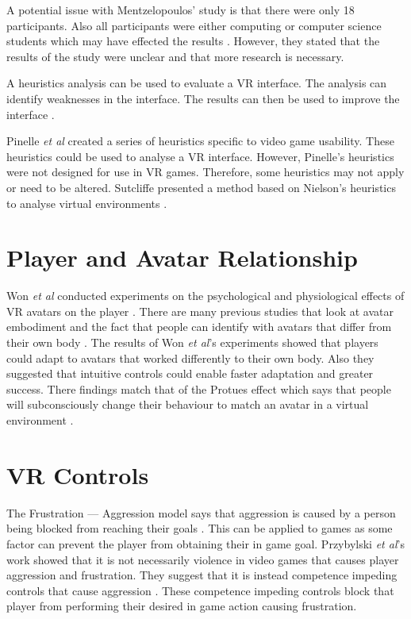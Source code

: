 \documentclass{scrartcl}
\begin{document}
A potential issue with Mentzelopoulos' study is that there were only 18 participants. Also all participants were either computing or computer science students which may have effected the results \cite{Mentzelopoulos}. However, they stated that the results of the study were unclear and that more research is necessary.

\bigskip 
 
A heuristics analysis can be used to evaluate a VR interface.  The analysis can identify weaknesses in the interface. The results can then be used to improve the interface \cite{Nielsen, Pinelle}.


Pinelle \textit{et al} created a series of heuristics specific to video game usability. These heuristics could be used to analyse a VR interface. However, Pinelle's heuristics were not designed for use in VR games.  Therefore, some heuristics may not apply or need to be altered.  Sutcliffe presented a method based on Nielson's heuristics to analyse virtual environments \cite{sutcliffe2004heuristic}.

\section{Player and Avatar Relationship}

Won \textit{et al} conducted experiments on the psychological and physiological effects of  VR avatars on the player \cite{won2015homuncular}. 
There are many previous studies that look at avatar embodiment and the fact that people can identify with avatars that differ from their own body \cite{Groen, Latoschik}.
The results of Won \textit{et al}'s experiments showed that players could adapt to avatars that worked differently to their own body. Also they suggested that intuitive controls could enable faster adaptation and greater success. There findings match that of the Protues effect which says that people will subconsciously change their behaviour to match an avatar in a virtual environment \cite{won2015homuncular, yee2007proteus}.


\section{VR Controls}
The Frustration --- Aggression model says that aggression is caused by a person being blocked from reaching their goals \cite{dollard1939frustration}.  This can be applied to games as some factor can prevent the player from obtaining their in game goal.  Przybylski \textit{et al}'s work showed that it is not necessarily violence in video games that causes player aggression and frustration. They suggest that it is instead competence impeding controls that cause aggression \cite{przybylski, przybylski2010motivational}. These competence impeding controls block that player from performing their desired in game action causing frustration. 
\end{document}
